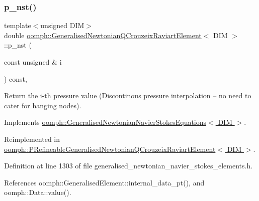 \subsubsection{\texorpdfstring{p\+\_\+nst()}{p\_nst()}\hspace{0.1cm}{\footnotesize\ttfamily [1/2]}}
{\footnotesize\ttfamily template$<$unsigned D\+IM$>$ \\
double \hyperlink{classoomph_1_1GeneralisedNewtonianQCrouzeixRaviartElement}{oomph\+::\+Generalised\+Newtonian\+Q\+Crouzeix\+Raviart\+Element}$<$ D\+IM $>$\+::p\+\_\+nst (\begin{DoxyParamCaption}\item[{const unsigned \&}]{i }\end{DoxyParamCaption}) const\hspace{0.3cm}{\ttfamily [inline]}, {\ttfamily [virtual]}}



Return the i-\/th pressure value (Discontinous pressure interpolation -- no need to cater for hanging nodes). 



Implements \hyperlink{classoomph_1_1GeneralisedNewtonianNavierStokesEquations_ae56b835810547b77405585b3a4091eec}{oomph\+::\+Generalised\+Newtonian\+Navier\+Stokes\+Equations$<$ D\+I\+M $>$}.



Reimplemented in \hyperlink{classoomph_1_1PRefineableGeneralisedNewtonianQCrouzeixRaviartElement_a2aa0981d2fccc40fe3b94763901ff844}{oomph\+::\+P\+Refineable\+Generalised\+Newtonian\+Q\+Crouzeix\+Raviart\+Element$<$ D\+I\+M $>$}.



Definition at line 1303 of file generalised\+\_\+newtonian\+\_\+navier\+\_\+stokes\+\_\+elements.\+h.



References oomph\+::\+Generalised\+Element\+::internal\+\_\+data\+\_\+pt(), and oomph\+::\+Data\+::value().

\mbox{\label{classoomph_1_1GeneralisedNewtonianQCrouzeixRaviartElement_ab7a1cfbce6b38ad1df95a9c3a6b8f597}} 
